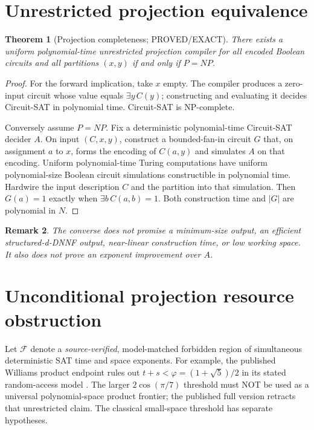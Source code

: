 \documentclass[11pt]{article}
\newtheorem{theorem}{Theorem}[section]
\newtheorem{remark}[theorem]{Remark}
\begin{document}
\section{Unrestricted projection equivalence}
\begin{theorem}[Projection completeness; PROVED/EXACT]
There exists a uniform polynomial-time unrestricted projection compiler
for all encoded Boolean circuits and all partitions $(x,y)$ if and only
if $P=NP$.
\end{theorem}
\begin{proof}
For the forward implication, take $x$ empty. The compiler produces a
zero-input circuit whose value equals $\exists y\,C(y)$; constructing
and evaluating it decides Circuit-SAT in polynomial time. Circuit-SAT
is NP-complete.

Conversely assume $P=NP$. Fix a deterministic polynomial-time
Circuit-SAT decider $A$. On input $(C,x,y)$, construct a bounded-fan-in
circuit $G$ that, on assignment $a$ to $x$, forms the encoding of
$C(a,y)$ and simulates $A$ on that encoding. Uniform polynomial-time
Turing computations have uniform polynomial-size Boolean circuit
simulations constructible in polynomial time. Hardwire the input
description $C$ and the partition into that simulation. Then
$G(a)=1$ exactly when $\exists b\,C(a,b)=1$. Both construction
time and $|G|$ are polynomial in $N$.
\end{proof}
\begin{remark}
The converse does not promise a minimum-size output, an efficient
structured-d-DNNF output, near-linear construction time, or low
working space. It also does not prove an exponent improvement over $A$.
\end{remark}

\section{Unconditional projection resource obstruction}
Let $\mathcal F$ denote a \emph{source-verified}, model-matched forbidden
region of simultaneous deterministic SAT time and space exponents.
For example, the published Williams product endpoint rules out
$t+s<\varphi=(1+\sqrt5)/2$ in its stated random-access model
\cite{williams}. The larger $2\cos(\pi/7)$ threshold must NOT be
used as a universal polynomial-space product frontier; the published
full version retracts that unrestricted claim. The classical
small-space threshold has separate hypotheses.
\end{document}
